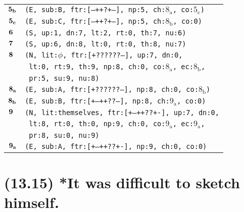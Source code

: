 \documentclass{article}
\begin{document}
\begin{minipage}{\textwidth}
{\begin{tabular}{|r|l|}
    ${\textbf{\textrm{5}}_{\textbf{\textrm{b}}}}$ & \texttt{\texttt{(E,~sub:B,~ftr:[---++?+--],~np:5,~ch:${\textrm{8}_{\textrm{a}}}$,~co:${\textrm{5}_{\textrm{c}}}$)}} \\
    ${\textbf{\textrm{5}}_{\textbf{\textrm{c}}}}$ & \texttt{\texttt{(E,~sub:C,~ftr:[---++?+--],~np:5,~ch:${\textrm{8}_{\textrm{b}}}$,~co:0)}} \\
    ${\textbf{\textrm{6}}_{\phantom{z}}}$ & \texttt{\texttt{(S,~up:1,~dn:7,~lt:2,~rt:0,~th:7,~nu:6)}} \\
    ${\textbf{\textrm{7}}_{\phantom{z}}}$ & \texttt{\texttt{(S,~up:6,~dn:8,~lt:0,~rt:0,~th:8,~nu:7)}} \\
    ${\textbf{\textrm{8}}_{\phantom{z}}}$ & \texttt{\texttt{(N,~lit:$\phi$,~ftr:[+??????--],~up:7,~dn:0,}} \\
    & \texttt{\texttt{~lt:0,~rt:9,~th:9,~np:8,~ch:0,~co:${\textrm{8}_{\textrm{a}}}$,~ec:${\textrm{8}_{\textrm{b}}}$,}} \\
    & \texttt{\texttt{~pr:5,~su:9,~nu:8)}} \\
    ${\textbf{\textrm{8}}_{\textbf{\textrm{a}}}}$ & \texttt{\texttt{(E,~sub:A,~ftr:[+??????--],~np:8,~ch:0,~co:${\textrm{8}_{\textrm{b}}}$)}} \\
    ${\textbf{\textrm{8}}_{\textbf{\textrm{b}}}}$ & \texttt{\texttt{(E,~sub:B,~ftr:[+--++??--],~np:8,~ch:${\textrm{9}_{\textrm{a}}}$,~co:0)}} \\
    ${\textbf{\textrm{9}}_{\phantom{z}}}$ & \texttt{\texttt{(N,~lit:themselves,~ftr:[+--++??+-],~up:7,~dn:0,}} \\
    & \texttt{\texttt{~lt:8,~rt:0,~th:0,~np:9,~ch:0,~co:${\textrm{9}_{\textrm{a}}}$,~ec:${\textrm{9}_{\textrm{a}}}$,}} \\
    & \texttt{\texttt{~pr:8,~su:0,~nu:9)}} \\
    ${\textbf{\textrm{9}}_{\textbf{\textrm{a}}}}$ & \texttt{\texttt{(E,~sub:A,~ftr:[+--++??+-],~np:9,~ch:0,~co:0)}} \\
    \hline
  \end{tabular}
  }
\end{minipage}
\bigbreak

\clearpage

%
%

\section*{(13.15) *It was difficult to sketch himself.}
\end{document}
